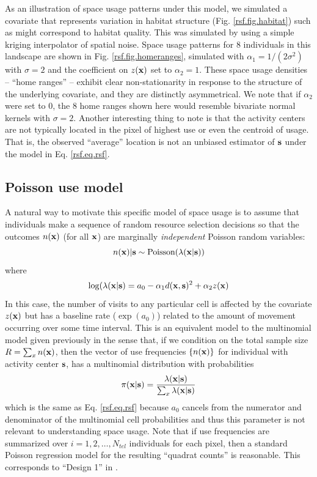 \documentclass[12pt]{article}
\begin{document}
As an illustration of space usage patterns under this model, we
simulated a covariate that represents variation in habitat structure
(Fig. \ref{rsf.fig.habitat}) such as might correspond to habitat
quality.
This was simulated by using a
simple kriging interpolator  of spatial noise.
Space usage patterns for
 8 individuals in this landscape are shown in Fig. \ref{rsf.fig.homeranges},
simulated with $\alpha_{1} = 1/(2\sigma^2)$ with $\sigma = 2$ and the
coefficient on $z({\bf x})$ set to $\alpha_{2} = 1$.
These space usage densities -- ``home ranges'' -- exhibit clear
non-stationarity in response to the structure of the underlying
covariate, and they are distinctly asymmetrical.  We note that if
$\alpha_{2}$ were set to 0, the 8 home ranges shown here would
resemble bivariate normal kernels with $\sigma = 2$.  Another
interesting thing to note is that the activity centers are not
typically located in the pixel of highest use or even the centroid of
usage. That is, the observed ``average'' location is not an unbiased
estimator of ${\bf s}$ under the model in Eq. \ref{rsf.eq.rsf}.


\subsection{Poisson use model}

A natural way to motivate this specific model of space usage is to
assume that individuals make a sequence of random resource selection
decisions so that the outcomes $n({\bf x})$ (for all ${\bf
  x}$) are marginally {\it
  independent} Poisson random variables:
\[
 n({\bf x})|{\bf s} \sim \mbox{Poisson}( \lambda({\bf x}|{\bf s}))
\]
where
\[
 \log(\lambda({\bf x}|{\bf s}) = a_{0} -\alpha_{1} d({\bf x},{\bf s})^{2} +  \alpha_{2} z({\bf x})
\]
 In this case, the number of visits to any particular cell is affected
by the covariate $z({\bf x})$ but has a baseline rate ($\exp(a_{0})$)
related to the amount of movement occurring over some time interval.
This is an equivalent model to the multinomial
model given previously in the sense that, if we condition on the total
sample size $R = \sum_{x} n({\bf x})$, then the vector of use
frequencies $\{ n({\bf x}) \}$ for individual with activity center ${\bf s}$,
has a multinomial distribution with probabilities
\[
 \pi({\bf x}|{\bf s}) = \frac{\lambda({\bf x}|{\bf s})}{\sum_{x}
   \lambda({\bf x}|{\bf s})}
\]
which is the same as Eq. \ref{rsf.eq.rsf} because $a_{0}$ cancels from
the numerator and denominator of the multinomial cell probabilities
and thus this parameter is not relevant to understanding space usage.
Note that if use frequencies are summarized over
$i=1,2,\ldots,N_{tel}$ individuals for each pixel, then a standard
Poisson regression model for the resulting ``quadrat counts'' is
reasonable. This corresponds to ``Design 1'' in
\citet{manly_etal:2002}.
\end{document}
